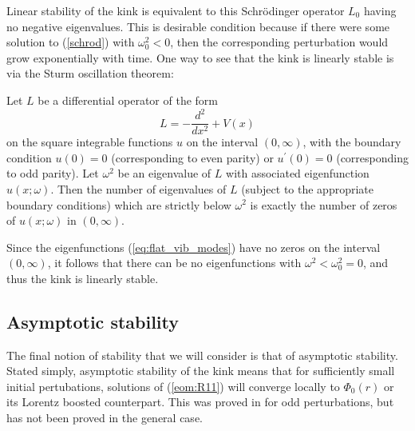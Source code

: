 Linear stability of the kink is equivalent to this Schr\"odinger operator $L_0$ having no negative eigenvalues. This is desirable condition because if there were some solution to (\ref{schrod}) with $\omega_0^2<0$, then the corresponding perturbation would grow exponentially with time. One way to see that the kink is linearly stable is via the Sturm oscillation theorem:

\begin{theo}[Sturm]\label{th:sturm} Let $L$ be a differential operator of the form
\[
L=-\frac{d^2}{dx^2}+V(x)
\]
on the square integrable functions $u$ on the interval $(0,\infty)$, with the boundary condition $u(0)=0$ (corresponding to even parity) or $u^\prime(0)=0$ (corresponding to odd parity). Let $\omega^2$ be an eigenvalue of $L$ with associated eigenfunction $u(x;\omega)$. Then the number of eigenvalues of $L$ (subject to the appropriate boundary conditions) which are strictly below $\omega^2$ is exactly the number of zeros of $u(x;\omega)$ in $(0,\infty)$.
\end{theo}

Since the eigenfunctions (\ref{eq:flat_vib_modes}) have no zeros on the interval $(0,\infty)$, it follows that there can be no eigenfunctions with $\omega^2<\omega_0^2=0$, and thus the kink is linearly stable.

\subsection{Asymptotic stability}
The final notion of stability that we will consider is that of asymptotic stability. Stated simply, asymptotic stability of the kink means that for sufficiently small initial pertubations, solutions of (\ref{eom:R11}) will converge locally to $\Phi_0(r)$ or its Lorentz boosted counterpart. This was proved in \cite{KowalczykMM} for odd perturbations, but has not been proved in the general case.

